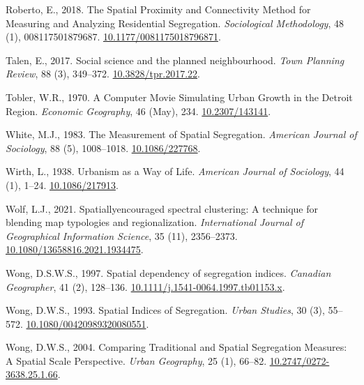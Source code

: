 \documentclass[
  10pt,
]{article}
\newlength{\cslhangindent}
\newenvironment{CSLReferences}[2] %
 {%
  \setlength{\parindent}{0pt}
  \ifodd #1 \everypar{\setlength{\hangindent}{\cslhangindent}}\ignorespaces\fi
  \ifnum #2 > 0
  \setlength{\parskip}{#2\baselineskip}
  \fi
 }%
 {}
\begin{document}
\begin{CSLReferences}{1}{0}
\leavevmode{}%
Roberto, E., 2018. The {Spatial Proximity} and {Connectivity Method} for
{Measuring} and {Analyzing Residential Segregation}. \emph{Sociological
Methodology}, 48 (1), 008117501879687.
\href{https://doi.org/10.1177/0081175018796871}{10.1177/0081175018796871}.

\leavevmode{}%
Talen, E., 2017. Social science and the planned neighbourhood.
\emph{Town Planning Review}, 88 (3), 349--372.
\href{https://doi.org/10.3828/tpr.2017.22}{10.3828/tpr.2017.22}.

\leavevmode{}%
Tobler, W.R., 1970. A {Computer Movie Simulating Urban Growth} in the
{Detroit Region}. \emph{Economic Geography}, 46 (May), 234.
\href{https://doi.org/10.2307/143141}{10.2307/143141}.

\leavevmode{}%
White, M.J., 1983. The {Measurement} of {Spatial Segregation}.
\emph{American Journal of Sociology}, 88 (5), 1008--1018.
\href{https://doi.org/10.1086/227768}{10.1086/227768}.

\leavevmode{}%
Wirth, L., 1938. Urbanism as a {Way} of {Life}. \emph{American Journal
of Sociology}, 44 (1), 1--24.
\href{https://doi.org/10.1086/217913}{10.1086/217913}.

\leavevmode{}%
Wolf, L.J., 2021. Spatially\textendash encouraged spectral clustering: A
technique for blending map typologies and regionalization.
\emph{International Journal of Geographical Information Science}, 35
(11), 2356--2373.
\href{https://doi.org/10.1080/13658816.2021.1934475}{10.1080/13658816.2021.1934475}.

\leavevmode{}%
Wong, D.S.W.S., 1997. Spatial dependency of segregation indices.
\emph{Canadian Geographer}, 41 (2), 128--136.
\href{https://doi.org/10.1111/j.1541-0064.1997.tb01153.x}{10.1111/j.1541-0064.1997.tb01153.x}.

\leavevmode{}%
Wong, D.W.S., 1993. Spatial {Indices} of {Segregation}. \emph{Urban
Studies}, 30 (3), 55--572.
\href{https://doi.org/10.1080/00420989320080551}{10.1080/00420989320080551}.

\leavevmode{}%
Wong, D.W.S., 2004. Comparing {Traditional} and {Spatial Segregation
Measures}: {A Spatial Scale Perspective}. \emph{Urban Geography}, 25
(1), 66--82.
\href{https://doi.org/10.2747/0272-3638.25.1.66}{10.2747/0272-3638.25.1.66}.

\end{CSLReferences}
\end{document}
